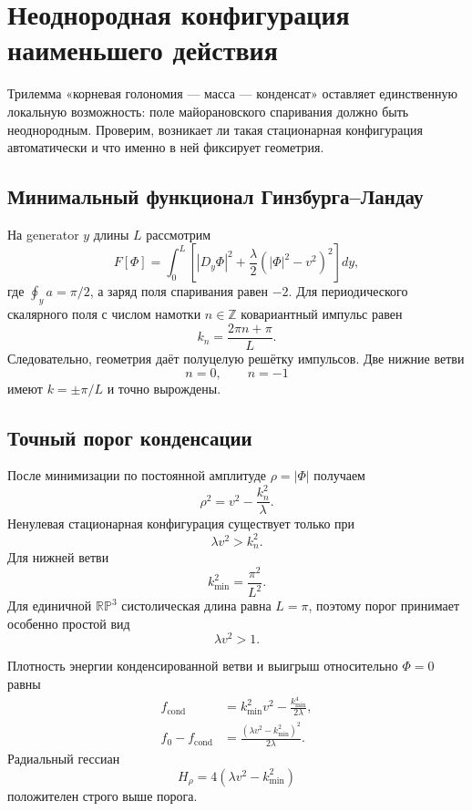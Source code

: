 \chapter{Неоднородная конфигурация наименьшего действия}

Трилемма «корневая голономия --- масса --- конденсат» оставляет
единственную локальную возможность: поле майорановского спаривания должно
быть неоднородным. Проверим, возникает ли такая стационарная конфигурация
автоматически и что именно в ней фиксирует геометрия.

\section{Минимальный функционал Гинзбурга--Ландау}

На generator \(y\) длины \(L\) рассмотрим
\begin{equation}
 F[\Phi]=\int_0^L
 \left[
 |D_y\Phi|^2+
 \frac{\lambda}{2}\left(|\Phi|^2-v^2\right)^2
 \right]dy,
\end{equation}
где \(\oint_y a=\pi/2\), а заряд поля спаривания равен \(-2\).
Для периодического скалярного поля с числом намотки
\(n\in\mathbb Z\) ковариантный импульс равен
\begin{equation}
 k_n=\frac{2\pi n+\pi}{L}.
\end{equation}
Следовательно, геометрия даёт полуцелую решётку импульсов. Две нижние ветви
\[
 n=0,\qquad n=-1
\]
имеют \(k=\pm\pi/L\) и точно вырождены.

\section{Точный порог конденсации}

После минимизации по постоянной амплитуде \(\rho=|\Phi|\) получаем
\begin{equation}
 \rho^2=v^2-\frac{k_n^2}{\lambda}.
\end{equation}
Ненулевая стационарная конфигурация существует только при
\begin{equation}
 \boxed{\lambda v^2>k_n^2}.
\end{equation}
Для нижней ветви
\[
 k_{\min}^2=\frac{\pi^2}{L^2}.
\]
Для единичной \(\mathbb{RP}^3\) систолическая длина равна \(L=\pi\),
поэтому порог
принимает особенно простой вид
\begin{equation}
 \lambda v^2>1.
\end{equation}

Плотность энергии конденсированной ветви и выигрыш относительно
\(\Phi=0\) равны
\begin{align}
 f_{\mathrm{cond}}
 &=k_{\min}^2v^2-\frac{k_{\min}^4}{2\lambda},\\
 f_0-f_{\mathrm{cond}}
 &=\frac{(\lambda v^2-k_{\min}^2)^2}{2\lambda}.
\end{align}
Радиальный гессиан
\begin{equation}
 H_\rho=4(\lambda v^2-k_{\min}^2)
\end{equation}
положителен строго выше порога.

